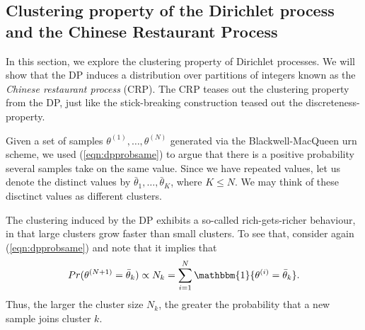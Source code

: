 \documentclass[final,3p,times,twocolumn]{elsarticle}
\begin{document}
\subsection{Clustering property of the Dirichlet process and the Chinese Restaurant Process}
\label{sect:crp}
In this section, we explore the clustering property of Dirichlet processes.
We will show that the DP induces a distribution over partitions of integers known as the \emph{Chinese restaurant process} (CRP).
The CRP teases out the clustering property from the DP, just like the stick-breaking construction teased out the discreteness-property.

Given a set of samples $\theta^{(1)},\dots,\theta^{(N)}$ generated via the Blackwell-MacQueen urn scheme, we used (\ref{eqn:dpprobsame}) to argue that there is a positive probability several samples take on the same value.
Since we have repeated values, let us denote the distinct values by $\bar \theta_1, \dots, \bar \theta_K$, where $K \leq N$.
We may think of these disctinct values as different clusters.

The clustering induced by the DP exhibits a so-called rich-gets-richer behaviour, in that large clusters grow faster than small clusters.
To see that, consider again (\ref{eqn:dpprobsame}) and note that it implies that
\begin{equation*}
Pr(\theta^{(N+1)} = \bar \theta_k) \propto N_k = \sum_{i=1}^N \mathbbm{1}\{\theta^{(i)} = \bar \theta_k\}.
\end{equation*}
Thus, the larger the cluster size $N_k$, the greater the probability that a new sample joins cluster $k$.
\end{document}
